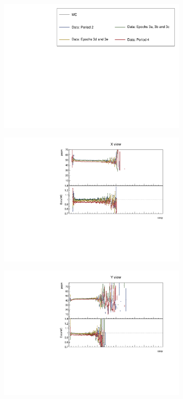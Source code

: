 \documentclass[12pt,a4paper]{article}
\begin{document}
\begin{figure}[!ht]
  \begin{subfigure}{\textwidth}
  \centering
    \includegraphics[height=0.2\linewidth]{essentialsec_tb/legend.pdf}
  \end{subfigure}
  \vspace*{2mm}
  
  \begin{subfigure}{0.5\textwidth}
    \includegraphics[width=\linewidth]{PlotsAngularDistribution/pecm_cosy_x.pdf}
  \end{subfigure}
  \begin{subfigure}{0.5\textwidth}
    \includegraphics[width=\linewidth]{PlotsAngularDistribution/pecm_cosy_y.pdf}

\end{subfigure}
\end{figure}
\end{document}
